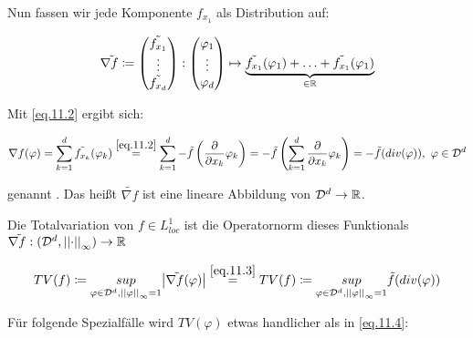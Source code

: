 Nun fassen wir jede Komponente $f_{x_1}$ als Distribution auf:

\[\tilde{\nabla f} \coloneqq \begin{pmatrix} \tilde{f_{x_1}}\\ \vdots \\ \tilde{f_{x_d}} \end{pmatrix}: \begin{pmatrix} \varphi_1 \\ \vdots \\ \varphi_d \end{pmatrix} \mapsto \underbrace{\tilde{f_{x_1}}(\varphi_1) + \hdots + \tilde{f_{x_1}}(\varphi_1)}_{\in \mathbb R}\]

Mit \eqref{eq.11.2} ergibt sich:

\begin{equation}\label{eq.11.3}
    \nabla f(\varphi)=\sum_{k=1}^d \tilde{f_{x_k}}(\varphi_k) \overset{\eqref{eq.11.2}}{=} \sum_{k=1}^d - \tilde{f}\left(\frac{\partial}{\partial x_k} \varphi_k \right) = -\tilde{f} \left( \sum_{k=1}^d \frac{\partial}{\partial x_k} \varphi_k \right) = - \tilde f (div(\varphi)), \ \varphi \in \mathcal{D}^d
\end{equation}

genannt . Das heißt $\tilde{\nabla f}$ ist eine lineare Abbildung von $\mathcal{D}^d \to \mathbb R$.

Die Totalvariation von $f \in L^1_{loc}$ ist die Operatornorm dieses Funktionals $\tilde{\nabla f}:(\mathcal{D}^d,\left|\left| \cdot \right|\right|_\infty) \to \mathbb R$

\begin{equation}\label{eq.11.4}
    TV(f) \coloneqq \underset{\varphi \in \mathcal{D}^d, \left|\left| \varphi \right|\right|_\infty = 1}{sup} \bigl| \tilde{\nabla f}(\varphi)\bigr| \overset{\eqref{eq.11.3}}{=} TV(f) \coloneqq \underset{\varphi \in \mathcal{D}^d, \left|\left| \varphi \right|\right|_\infty = 1}{sup} \tilde{f}(div(\varphi))
\end{equation}

Für folgende Spezialfälle wird  $TV(\varphi)$ etwas handlicher als in \eqref{eq.11.4}:

